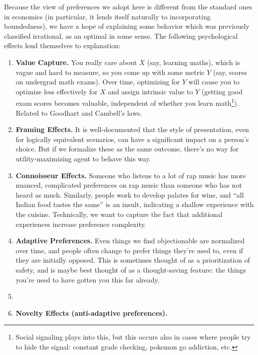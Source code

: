 \documentclass{article}
\theoremstyle{plain}
\theoremstyle{definition}
\theoremstyle{remark}
\begin{document}
	Because the view of preferences we adopt here is different from the standard ones in economics (in particular, it lends itself naturally to incorporating boundedness), we have a hope of explaining some behavior which was previously classified irrational, as an optimal in some sense. The following psychological effects lend themselves to explanation:
	\begin{enumerate}[noitemsep]
		\item \textbf{Value Capture.} You really care about $X$ (say, learning maths), which is vague and hard to measure, so you come up with some metric $Y$ (say, scores on undergrad math exams). Over time, optimizing for $Y$ will cause you to optimize less effectively for $X$ and assign intrinsic value to $Y$ (getting good exam scores becomes valuable, independent of whether you learn math\footnote{Social signaling plays into this, but this occurs also in cases where people try to hide the signal: constant grade checking, pokemon go addiction, etc.}). Related to Goodhart and Cambell's laws.
		\item \textbf{Framing Effects.} It is well-documented that the style of presentation, even for logically equivalent scenarios, can have a significant impact on a person's choice. But if we formalize these as the same outcome, there's no way for utility-maximizing agent to behave this way.
		\item \textbf{Connoisseur Effects.} Someone who listens to a lot of rap music has more nuanced, complicated preferences on rap music than someone who has not heard as much. Similarly, people work to develop palates for wine, and ``all Indian food tastes the same'' is an insult, indicating a shallow experience with the cuisine. Technically, we want to capture the fact that additional experiences increase preference complexity.
		
		\item \textbf{Adaptive Preferences.} Even things we find objectionable are normalized over time, and people often change to prefer things they're used to, even if they are initially opposed. This is sometimes thought of as a prioritization of safety, and is maybe best thought of as a thought-saving feature: the things you're used to have gotten you this far already. 
		
		\item \textbf{}
		 
		\item \textbf{Novelty Effects (anti-adaptive preferences).} 

	\end{enumerate}
\end{document}
